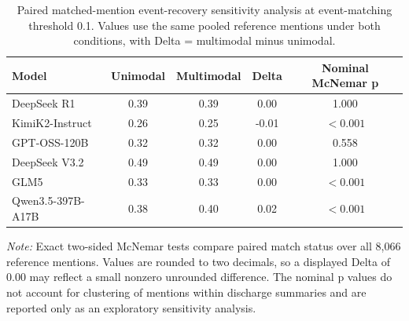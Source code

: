 \begin{table}[htbp]
\caption{Paired matched-mention event-recovery sensitivity analysis at event-matching threshold 0.1. Values use the same pooled reference mentions under both conditions, with Delta = multimodal minus unimodal.}
\ChEightTableBodyStart
\begin{ChEightFloatBody}

\small

\centering
\begin{tabular}{@{}lcccc@{}}
\toprule
\textbf{Model} & \textbf{Unimodal} & \textbf{Multimodal} & \textbf{Delta} & \textbf{Nominal McNemar p} \\
\midrule
DeepSeek R1 & 0.39 & 0.39 & 0.00 & 1.000 \\
KimiK2-Instruct & 0.26 & 0.25 & -0.01 & $<0.001$ \\
GPT-OSS-120B & 0.32 & 0.32 & 0.00 & 0.558 \\
DeepSeek V3.2 & 0.49 & 0.49 & 0.00 & 1.000 \\
GLM5 & 0.33 & 0.33 & 0.00 & $<0.001$ \\
Qwen3.5-397B-A17B & 0.38 & 0.40 & 0.02 & $<0.001$ \\
\bottomrule
\end{tabular}
\par
\begin{minipage}{\textwidth}
\footnotesize\textit{Note:} Exact two-sided McNemar tests compare paired match status over all 8,066 reference mentions. Values are rounded to two decimals, so a displayed Delta of 0.00 may reflect a small nonzero unrounded difference. The nominal p values do not account for clustering of mentions within discharge summaries and are reported only as an exploratory sensitivity analysis.
\end{minipage}

\end{ChEightFloatBody}
\end{table}